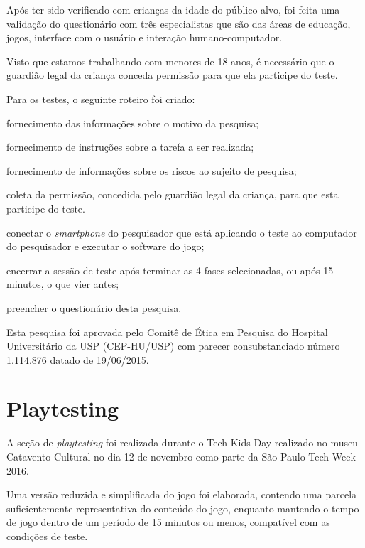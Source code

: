 Após ter sido verificado com crianças da idade do público alvo, 
foi feita uma validação do questionário com três especialistas 
que são das áreas de educação, jogos, interface com o usuário e 
interação humano-computador.

Visto que estamos trabalhando com menores de 18 anos, é necessário 
que o guardião legal da criança conceda permissão para que ela 
participe do teste.	

Para os testes, o seguinte roteiro foi criado:

\begin{alineas}
	\item fornecimento das informações sobre o motivo da pesquisa;
	\item fornecimento de instruções sobre a tarefa a ser realizada;
	\item fornecimento de informações sobre os riscos ao sujeito de pesquisa;
	\item coleta da permissão, concedida pelo guardião legal da criança, para que esta participe do teste.
	\item conectar o \textit{smartphone} do pesquisador que está aplicando o teste ao computador do pesquisador e executar o software do jogo; 
	\item encerrar a sessão de teste após terminar as 4 fases selecionadas, ou após 15 minutos, o que vier antes;
	\item preencher o questionário desta pesquisa.
\end{alineas}



Esta pesquisa foi aprovada pelo Comitê de Ética em Pesquisa do 
Hospital Universitário da USP (CEP-HU/USP) com parecer 
consubstanciado número 1.114.876 datado de 19/06/2015.

\section{Playtesting}\label{sec-playtesting}

A seção de \textit{playtesting} foi realizada durante o Tech Kids Day 
realizado no museu Catavento Cultural no dia 12 de novembro como parte 
da São Paulo Tech Week 2016. 

Uma versão reduzida e simplificada do jogo foi elaborada, contendo uma 
parcela suficientemente representativa do conteúdo do jogo, enquanto 
mantendo o tempo de jogo dentro de um período de 15 minutos ou menos, 
compatível com as condições de teste.

